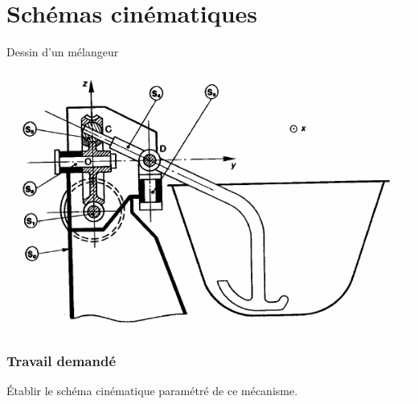 
\section{Schémas cinématiques}



Dessin d'un mélangeur
\begin{center}
    \includegraphics[scale=0.7]{png/melangeur.png}
\end{center}

\subsubsection{Travail demandé}
Établir le schéma cinématique paramétré de ce mécanisme.\\

\newpage

